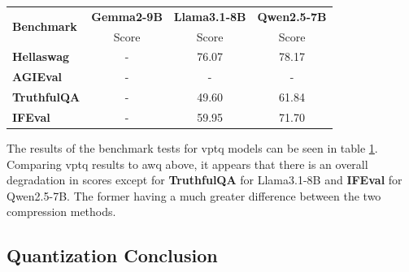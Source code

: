 \documentclass{ifacconf}
\begin{document}
    \begin{table}[H]
        \centering
        \begin{tabular}{|l|c|c|c|}
            \hline
            \multirow{2}{*}{\textbf{Benchmark}} & \textbf{Gemma2-9B} & \textbf{Llama3.1-8B} & \textbf{Qwen2.5-7B} \\ \cline{2-4}
                                                & Score    & Score      & Score      \\ \hline
            \textbf{Hellaswag}                & -            & 76.07              & 78.17              \\ \hline
            \textbf{AGIEval}                  & -            & -              & -              \\ \hline
            \textbf{TruthfulQA}               & -            & 49.60              & 61.84              \\ \hline
            \textbf{IFEval}                   & -            & 59.95              & 71.70              \\ \hline
        \end{tabular}
        \label{tab:vptq_results}
    \end{table}

    The results of the benchmark tests for \gls{vptq} models can be seen in table \ref{tab:vptq_results}. Comparing \gls{vptq} results to \gls{awq} above, it appears that there is an overall degradation in scores except for \textbf{TruthfulQA} for Llama3.1-8B and \textbf{IFEval} for Qwen2.5-7B. The former having a much greater difference between the two compression methods.
    \newpage

    \subsection{Quantization Conclusion}
\end{document}
